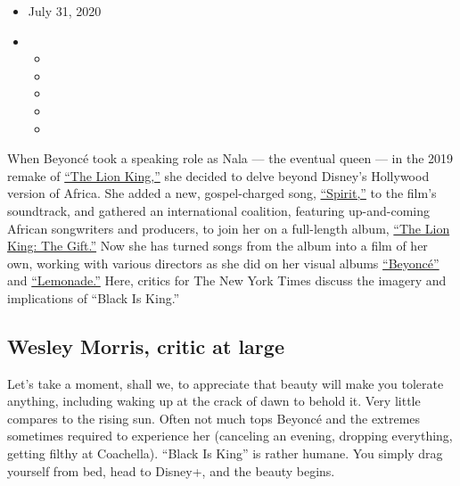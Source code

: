\begin{itemize}
\item
  July 31, 2020
\item
  \begin{itemize}
  \item
  \item
  \item
  \item
  \item
  \end{itemize}
\end{itemize}

When Beyoncé took a speaking role as Nala --- the eventual queen --- in
the 2019 remake of
\href{https://www.nytimes.com/2019/07/11/movies/the-lion-king-review.html}{``The
Lion King,''} she decided to delve beyond Disney's Hollywood version of
Africa. She added a new, gospel-charged song,
\href{https://www.nytimes.com/2019/07/12/arts/music/playlist-beyonce-billie-eilish-justin-bieber-ed-sheeran.html}{``Spirit,''}
to the film's soundtrack, and gathered an international coalition,
featuring up-and-coming African songwriters and producers, to join her
on a full-length album,
\href{https://www.nytimes.com/2019/07/24/arts/music/beyonce-the-lion-king-the-gift-review.html}{``The
Lion King: The Gift.''} Now she has turned songs from the album into a
film of her own, working with various directors as she did on her visual
albums
\href{https://www.nytimes.com/2013/12/14/arts/music/beyonces-new-album-is-steamy-and-sleek.html}{``Beyoncé''}
and
\href{https://www.nytimes.com/2016/04/25/arts/music/beyonce-lemonade.html}{``Lemonade.''}
Here, critics for The New York Times discuss the imagery and
implications of ``Black Is King.''

\hypertarget{wesley-morris-critic-at-large}{%
\subsection{Wesley Morris, critic at
large}\label{wesley-morris-critic-at-large}}

Let's take a moment, shall we, to appreciate that beauty will make you
tolerate anything, including waking up at the crack of dawn to behold
it. Very little compares to the rising sun. Often not much tops Beyoncé
and the extremes sometimes required to experience her (canceling an
evening, dropping everything, getting filthy at Coachella). ``Black Is
King'' is rather humane. You simply drag yourself from bed, head to
Disney+, and the beauty begins.

